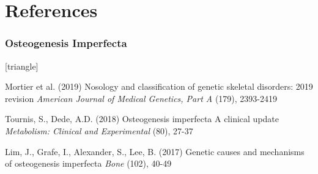 \documentclass[xcolor=table,11pt]{beamer}
\begin{document}
	\section{References}
	\begin{frame}
		\frametitle{Osteogenesis Imperfecta}
		\footnotesize{
				\begin{thebibliography}{99}
						[triangle]
						
						 Mortier et al. (2019)
						\newblock Nosology and classification of genetic skeletal disorders: 2019 revision
						\newblock \textit{American Journal of Medical Genetics, Part A} (179), 2393-2419
						
						 Tournis, S., Dede, A.D. (2018)
						\newblock Osteogenesis imperfecta A clinical update
						\newblock \textit{Metabolism: Clinical and Experimental} (80), 27-37
						
						  Lim, J., Grafe, I., Alexander, S., Lee, B. (2017)
						\newblock Genetic causes and mechanisms of osteogenesis imperfecta
						\newblock \textit{Bone} (102), 40-49
						
					\end{thebibliography}
			}
	\end{frame}
	
	
\end{document}
